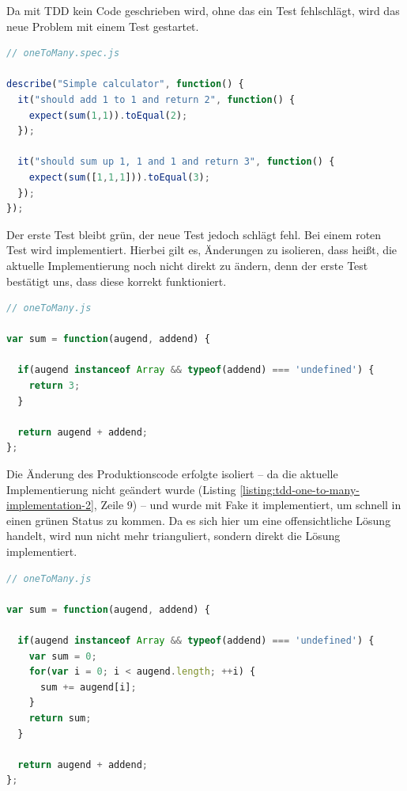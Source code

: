 Da mit TDD kein Code geschrieben wird, ohne das ein Test fehlschlägt, wird das neue Problem mit einem Test gestartet.

\begin{lstlisting}[language=JavaScript, caption=TDD - One to many - 2]
// oneToMany.spec.js

describe("Simple calculator", function() {
  it("should add 1 to 1 and return 2", function() {
    expect(sum(1,1)).toEqual(2);
  });

  it("should sum up 1, 1 and 1 and return 3", function() {
    expect(sum([1,1,1])).toEqual(3);
  });
});

\end{lstlisting}

Der erste Test bleibt grün, der neue Test jedoch schlägt fehl. Bei einem roten Test wird implementiert. Hierbei gilt es, Änderungen zu isolieren, dass heißt, die aktuelle Implementierung noch nicht direkt zu ändern, denn der erste Test bestätigt uns, dass diese korrekt funktioniert.

\begin{lstlisting}[language=JavaScript, caption=TDD - One to many - Implementation - 2, label=listing:tdd-one-to-many-implementation-2]
// oneToMany.js

var sum = function(augend, addend) {

  if(augend instanceof Array && typeof(addend) === 'undefined') {
    return 3;
  }

  return augend + addend;
};
\end{lstlisting}

Die Änderung des Produktionscode erfolgte isoliert -- da die aktuelle Implementierung nicht geändert wurde (Listing \ref{listing:tdd-one-to-many-implementation-2}, Zeile 9) -- und wurde mit Fake it implementiert, um schnell in einen grünen Status zu kommen. Da es sich hier um eine offensichtliche Lösung handelt, wird nun nicht mehr trianguliert, sondern direkt die Lösung implementiert.
\newpage
\begin{lstlisting}[language=JavaScript, caption=TDD - One to many - Implementation - 3]
// oneToMany.js

var sum = function(augend, addend) {

  if(augend instanceof Array && typeof(addend) === 'undefined') {
    var sum = 0;
    for(var i = 0; i < augend.length; ++i) {
      sum += augend[i];
    }
    return sum;
  }

  return augend + addend;
};
\end{lstlisting}

